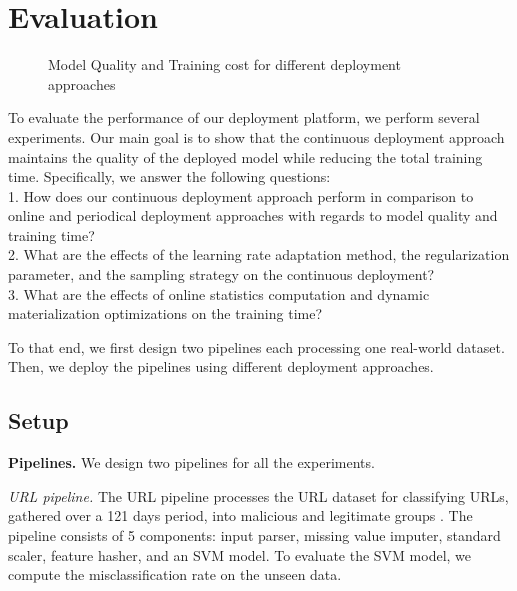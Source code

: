 \section{Evaluation} \label{evaluation} 
\begin{figure*}[t]
\centering
\resizebox{\textwidth}{!}{}
 \vspace{-20pt}
\caption{Model Quality and Training cost for different deployment approaches}
 \vspace{-10pt}
\label{deployment-quality-figure}
\end{figure*}
To evaluate the performance of our deployment platform, we perform several experiments.
Our main goal is to show that the continuous deployment approach maintains the quality of the deployed model while reducing the total training time.
Specifically, we answer the following questions:\\
1. How does our continuous deployment approach perform in comparison to online and periodical deployment approaches with regards to model quality and training time? \\
2. What are the effects of the learning rate adaptation method, the regularization parameter, and the sampling strategy on the continuous deployment? \\
3. What are the effects of online statistics computation and dynamic materialization optimizations on the training time?

To that end, we first design two pipelines each processing one real-world dataset.
Then, we deploy the pipelines using different deployment approaches.
\subsection{Setup}\label{subsec:setup}
\textbf{Pipelines.}
We design two pipelines for all the experiments.

\textit{URL pipeline.} The URL pipeline processes the URL dataset for classifying URLs, gathered over a 121 days period, into malicious and legitimate groups \cite{ma2009identifying}.
The pipeline consists of 5 components: input parser, missing value imputer, standard scaler, feature hasher, and an SVM model.
To evaluate the SVM model, we compute the misclassification rate on the unseen data.

